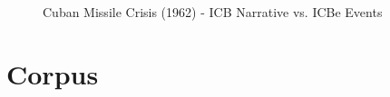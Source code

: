 \documentclass{article}
\begin{document}
\begin{figure}[H]
\caption{Cuban Missile Crisis (1962) - ICB Narrative vs. ICBe Events \label{fig:case_study_cuban_precision}}
\end{figure}
\clearpage

\hypertarget{corpus}{%
\section{Corpus}\label{corpus}}
\end{document}
